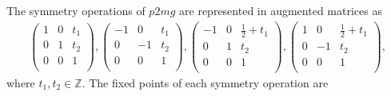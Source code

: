 The symmetry operations of $p2mg$ are represented in augmented matrices as
\begin{align*}
  \left(
    \begin{array}{cc|c}
        1 & 0 & t_{1} \\
        0 & 1 & t_{2} \\
        \hline
        0 & 0 & 1 \\
    \end{array}
  \right),
  \left(
    \begin{array}{cc|c}
        -1 & 0 & t_{1} \\
        0  & -1 & t_{2} \\
        \hline
        0 & 0 & 1 \\
    \end{array}
  \right),
  \left(
    \begin{array}{cc|c}
        -1 & 0 & \frac{1}{2} + t_{1} \\
        0  & 1 & t_{2} \\
        \hline
        0 & 0 & 1 \\
    \end{array}
  \right),
  \left(
    \begin{array}{cc|c}
        1 & 0 & \frac{1}{2} + t_{1} \\
        0  & -1 & t_{2} \\
        \hline
        0 & 0 & 1 \\
    \end{array}
  \right),
\end{align*}
where $t_{1}, t_{2} \in \mathbb{Z}$.
The fixed points of each symmetry operation are
